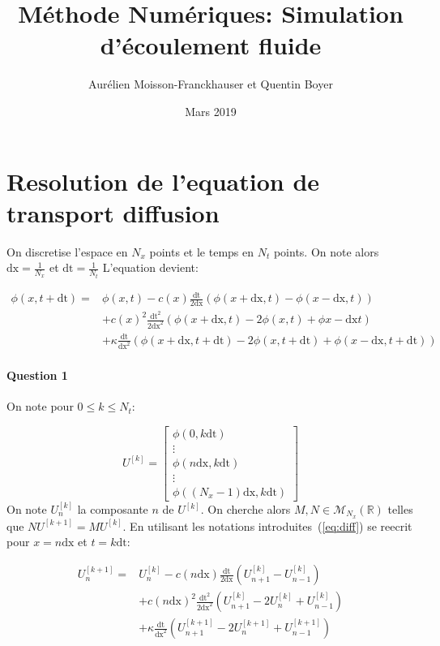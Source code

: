 \documentclass{article}
\newcommand{\dx}{\mathrm{dx}}
\newcommand{\dt}{\mathrm{dt}}
\begin{document}
\title{Méthode Numériques: Simulation d'écoulement fluide}
\author{Aurélien Moisson-Franckhauser et Quentin Boyer}
\date{Mars 2019}
\maketitle
\tableofcontents

\section{Resolution de l'equation de transport diffusion}

On discretise l'espace en $N_x$ points et le temps en $N_t$ points. On note alors $\mathrm{dx}=\frac{1}{N_x}$ et $\mathrm{dt}=\frac{1}{N_t}$
L'equation devient:


\begin{equation}
	\begin{aligned}
	\phi(x,t+\dt) ={} & \phi(x,t)-c(x)\frac{\dt}{2\dx}(\phi(x+\dx, t)-\phi(x-\dx,t)) \\
					&+c{(x)}^2\frac{\dt^{2}}{2\dx^{2}}(\phi(x+\dx,t)-2\phi(x, t)+\phi{x-\dx}{t}) \\
					&+\kappa\frac{\dt}{\dx^2}(\phi(x+\dx,t+\dt)-2\phi(x,t+\dt)+\phi(x-\dx,t+\dt))
	\end{aligned}
	\label{eq:diff}
\end{equation}


\paragraph{Question 1}
On note pour $0 \leq k \le N_t$:

\[U^{[k]}=
\begin{bmatrix}
	\phi(0, k\dt) \\
	\vdots \\
	\phi(n\dx, k\dt) \\
	\vdots \\
	\phi((N_x-1)\dx, k\dt)
\end{bmatrix}
\]
On note $U_n^{[k]}$ la composante $n$ de $U^{[k]}$. On cherche alors $ M,N \in \mathcal{M}_{N_x}(\mathbb{R})$ telles que $NU^{[k+1]}=MU^{[k]}$.
En utilisant les notations introduites~(\ref{eq:diff}) se reecrit pour $x=n\dx$ et $t=k\dt$:

\[
	\begin{aligned}
		U^{[k+1]}_n ={} & U_n^{[k]} - c(n\dx)\frac{\dt}{2\dx}(U_{n+1}^{[k]}-U_{n-1}^{[k]}) \\
		& +c{(n\dx)}^2\frac{\dt^{2}}{2\dx^{2}}(U_{n+1}^{[k]}-2U_{n}^{[k]}+U_{n-1}^{[k]}) \\
						& +\kappa\frac{\dt}{\dx^2}(U_{n+1}^{[k+1]}-2U_{n}^{[k+1]}+U_{n-1}^{[k+1]})
	\end{aligned}
\]
\end{document}

